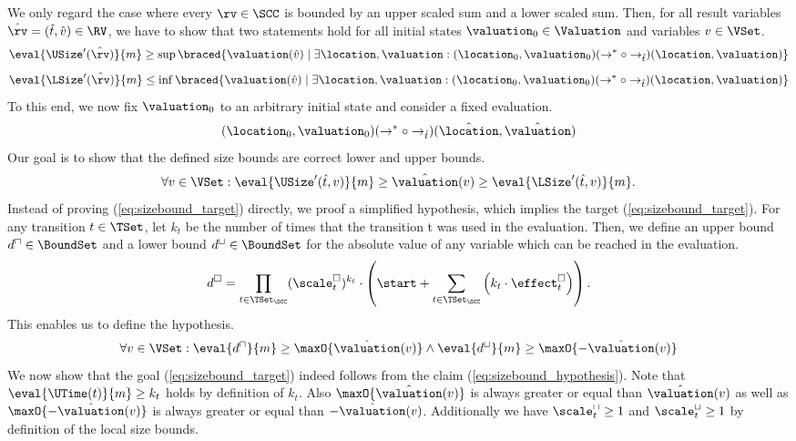 We only regard the case where every $\rv \in \SCC$ is bounded by an upper scaled sum and a lower scaled sum.
Then, for all result variables $\hat{\rv} = (\hat{t}, \hat{v}) \in \RV$, we have to show that two statements hold for all initial states $\valuation_0 \in \Valuation$ and variables $v \in \VSet$.
\[ \eval{\USize'(\hat{\rv})}{m} \geq \sup \braced{ \valuation(\hat{v}) \mid \exists \location, \valuation: (\location_0, \valuation_0) (\rightarrow^* \circ \rightarrow_{\hat{t}}) (\location, \valuation)} \]
\[ \eval{\LSize'(\hat{\rv})}{m} \leq \inf \braced{ \valuation(\hat{v}) \mid \exists \location, \valuation: (\location_0, \valuation_0) (\rightarrow^* \circ \rightarrow_{\hat{t}}) (\location, \valuation)} \]
To this end, we now fix $\valuation_0$ to an arbitrary initial state and consider a fixed evaluation.
\[ (\location_0, \valuation_0) (\rightarrow^* \circ \rightarrow_{\hat{t}}) (\hat{\location}, \hat{\valuation}) \]
Our goal is to show that the defined size bounds are correct lower and upper bounds.
\begin{equation} \label{eq:sizebound_target}
  \forall v \in \VSet: \eval{\USize'(\hat{t}, v)}{m} \geq \hat{\valuation}(v) \geq \eval{\LSize'(\hat{t}, v)}{m}.
\end{equation}
Instead of proving (\ref{eq:sizebound_target}) directly, we proof a simplified hypothesis, which implies the target (\ref{eq:sizebound_target}).
For any transition $t \in \TSet$, let $k_t$ be the number of times that the transition t was used in the evaluation.
Then, we define an upper bound $d^\sqcap \in \BoundSet$ and a lower bound $d^\sqcup \in \BoundSet$ for the absolute value of any variable which can be reached in the evaluation.
\[ d^\square = \prod_{t \in \TSet_\SCC} (\scale^\square_t)^{k_t} \cdot \left( \start + \sum_{t \in \TSet_\SCC} \left( k_t \cdot \effect^\square_t \right) \right). \]
This enables us to define the hypothesis.
\begin{equation} \label{eq:sizebound_hypothesis}
  \forall v \in \VSet: \eval{d^\sqcap}{m} \geq \maxO{\hat{\valuation}(v)} \wedge \eval{d^\sqcup}{m} \geq \maxO{-\hat{\valuation}(v)}
\end{equation}
We now show that the goal (\ref{eq:sizebound_target}) indeed follows from the claim (\ref{eq:sizebound_hypothesis}).
Note that $\eval{\UTime(t)}{m} \geq k_t$ holds by definition of $k_t$.
Also $\maxO{\hat{\valuation}(v)}$ is always greater or equal than $\hat{\valuation}(v)$ as well as $\maxO{-\hat{\valuation}(v)}$ is always greater or equal than $-\hat{\valuation}(v)$.
Additionally we have $\scale^\sqcap_t \geq 1$ and $\scale^\sqcup_t \geq 1$ by definition of the local size bounds.

